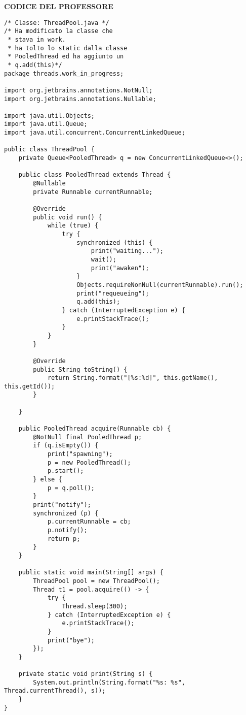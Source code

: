 \noindent \textbf{CODICE DEL PROFESSORE} \newline
\begin{lstlisting}[basicstyle=\small,]
/* Classe: ThreadPool.java */
/* Ha modificato la classe che
 * stava in work.
 * ha tolto lo static dalla classe
 * PooledThread ed ha aggiunto un 
 * q.add(this)*/
package threads.work_in_progress;

import org.jetbrains.annotations.NotNull;
import org.jetbrains.annotations.Nullable;

import java.util.Objects;
import java.util.Queue;
import java.util.concurrent.ConcurrentLinkedQueue;

public class ThreadPool {
    private Queue<PooledThread> q = new ConcurrentLinkedQueue<>();

    public class PooledThread extends Thread {
        @Nullable
        private Runnable currentRunnable;

        @Override
        public void run() {
            while (true) {
                try {
                    synchronized (this) {
                        print("waiting...");
                        wait();
                        print("awaken");
                    }
                    Objects.requireNonNull(currentRunnable).run();
                    print("requeueing");
                    q.add(this);
                } catch (InterruptedException e) {
                    e.printStackTrace();
                }
            }
        }

        @Override
        public String toString() {
            return String.format("[%s:%d]", this.getName(), this.getId());
        }

    }

    public PooledThread acquire(Runnable cb) {
        @NotNull final PooledThread p;
        if (q.isEmpty()) {
            print("spawning");
            p = new PooledThread();
            p.start();
        } else {
            p = q.poll();
        }
        print("notify");
        synchronized (p) {
            p.currentRunnable = cb;
            p.notify();
            return p;
        }
    }

    public static void main(String[] args) {
        ThreadPool pool = new ThreadPool();
        Thread t1 = pool.acquire(() -> {
            try {
                Thread.sleep(300);
            } catch (InterruptedException e) {
                e.printStackTrace();
            }
            print("bye");
        });
    }

    private static void print(String s) {
        System.out.println(String.format("%s: %s", Thread.currentThread(), s));
    }
}

\end{lstlisting}
 


